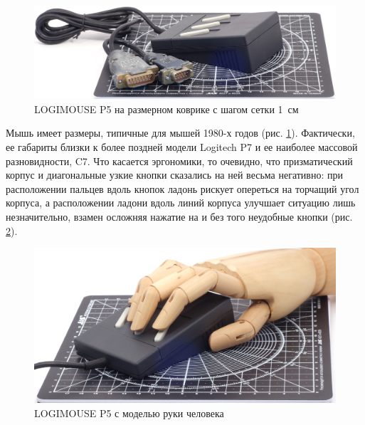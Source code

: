 \documentclass[11pt, a4paper]{article}
\begin{document}
\begin{figure}[h]
    \centering
    \includegraphics[scale=0.5]{1983_logitech_logimouse_p5/size_30.jpg}
    \caption{LOGIMOUSE P5 на размерном коврике с шагом сетки 1~см}
    \label{fig:LogimouseP5Size}
\end{figure}

Мышь имеет размеры, типичные для мышей 1980-х годов (рис. \ref{fig:LogimouseP5Size}). Фактически, ее габариты близки к более поздней модели Logitech P7 и ее наиболее массовой разновидности, C7. Что касается эргономики, то очевидно, что призматический корпус и диагональные узкие кнопки сказались на ней весьма негативно: при расположении пальцев вдоль кнопок ладонь рискует опереться на торчащий угол корпуса, а расположении ладони вдоль линий корпуса улучшает ситуацию лишь незначительно, взамен осложняя нажатие на и без того неудобные кнопки (рис. \ref{fig:LogimouseP5Hand}).

\begin{figure}[h]
    \centering
    \includegraphics[scale=0.5]{1983_logitech_logimouse_p5/hand_30.jpg}
    \caption{LOGIMOUSE P5 с моделью руки человека}
    \label{fig:LogimouseP5Hand}
\end{figure}
\end{document}
